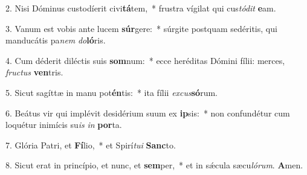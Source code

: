 2. Nisi Dóminus custodíerit civi\textbf{tá}tem,~*  frustra vígilat qui cus\textit{tó}\textit{dit} \textbf{e}am.\

3. Vanum est vobis ante lucem \textbf{súr}gere:~*  súrgite postquam sedéritis, qui manducátis pa\textit{nem} \textit{do}\textbf{ló}ris.\

4. Cum déderit diléctis suis \textbf{som}num:~*  ecce heréditas Dómini fílii: merces, \textit{fruc}\textit{tus} \textbf{ven}tris.\

5. Sicut sagíttæ in manu pot\textbf{én}tis:~*  ita fílii \textit{ex}\textit{cus}\textbf{só}rum.\

6. Beátus vir qui implévit desidérium suum ex \textbf{ip}sis:~*  non confundétur cum loquétur inimícis su\textit{is} \textit{in} \textbf{por}ta.\

7. Glória Patri, et \textbf{Fí}lio,~*  et Spirí\textit{tu}\textit{i} \textbf{Sanc}to.\

8. Sicut erat in princípio, et nunc, et \textbf{sem}per,~*  et in sǽcula sæcu\textit{ló}\textit{rum}. \textbf{A}men.\


